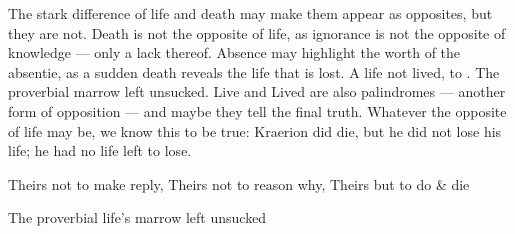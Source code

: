 The stark difference of life and death may make them appear as opposites, but they are not. Death is not the opposite of life, as ignorance is not the opposite of knowledge — only a lack thereof. Absence may highlight the worth of the absentie, as a sudden death reveals the life that is lost.
A life not lived, to . The proverbial marrow left unsucked. Live and Lived are also palindromes — another form of opposition — and maybe they tell the final truth.
Whatever the opposite of life may be, we know this to be true: Kraerion did die, but he did not lose his life; he had no life left to lose.


Theirs not to make reply,
Theirs not to reason why,
Theirs but to do \& die


The proverbial life's marrow left unsucked